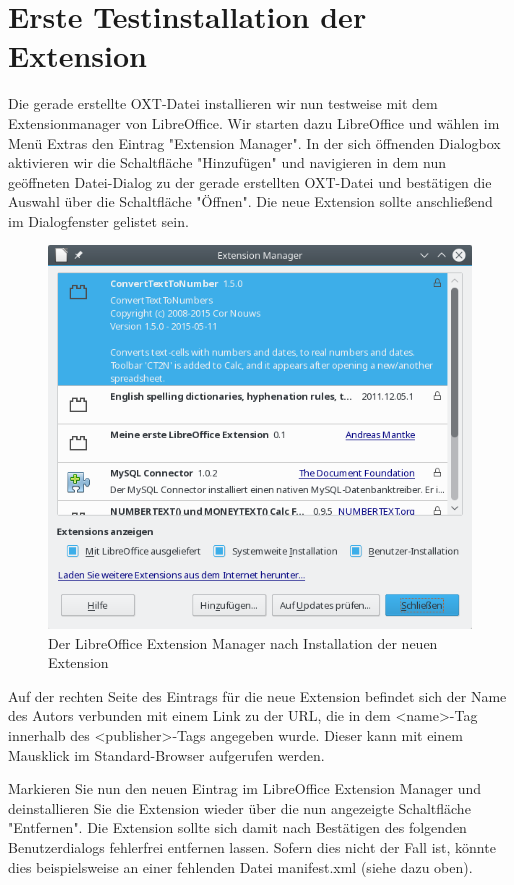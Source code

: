 \documentclass[a4paper,10pt,pagesize,titlepage]{scrbook}
\begin{document}
\section{Erste Testinstallation der Extension}

Die gerade erstellte OXT-Datei installieren wir nun testweise mit dem Extensionmanager von LibreOffice. Wir starten dazu LibreOffice und wählen im Menü Extras den Eintrag "Extension Manager". In der sich öffnenden Dialogbox aktivieren wir die Schaltfläche "Hinzufügen" und navigieren in dem nun geöffneten Datei-Dialog zu der gerade erstellten OXT-Datei und bestätigen die Auswahl über die Schaltfläche "Öffnen". Die neue Extension sollte anschließend im Dialogfenster gelistet sein.
\begin{figure}
\centering
\includegraphics[width=0.7\linewidth]{pics/extensionmanager_extension_load01}
\caption[Extension Manager mit installierter Extension]{Der LibreOffice Extension Manager nach Installation der neuen Extension}
\label{fig:extensionmanager_extension_load01}
\end{figure}

Auf der rechten Seite des Eintrags für die neue Extension befindet sich der Name des Autors verbunden mit einem Link zu der URL, die in dem <name>-Tag innerhalb des <publisher>-Tags angegeben wurde. Dieser kann mit einem Mausklick im Standard-Browser aufgerufen werden.

Markieren Sie nun den neuen Eintrag im LibreOffice Extension Manager und deinstallieren Sie die Extension wieder über die nun angezeigte Schaltfläche "Entfernen". Die Extension sollte sich damit nach Bestätigen des folgenden Benutzerdialogs fehlerfrei entfernen lassen. Sofern dies nicht der Fall ist, könnte dies beispielsweise an einer fehlenden Datei manifest.xml (siehe dazu oben).
\end{document}
